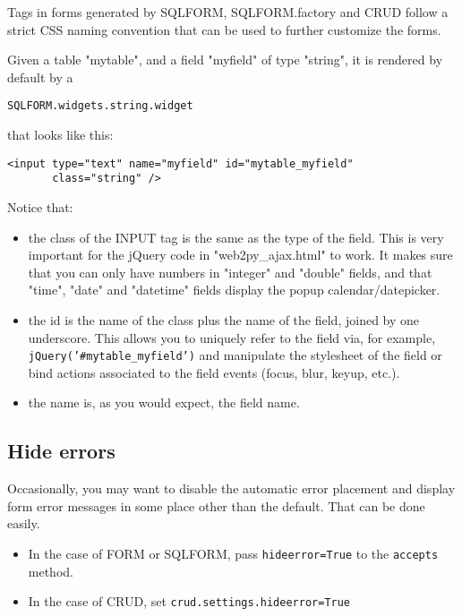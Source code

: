 \documentclass[justified,sixbynine,notoc]{tufte-book}
\def\ft{\small\tt}
\def\inxx#1{\index{#1}}
\begin{document}
\begin{fullwidth}
Tags in forms generated by SQLFORM, SQLFORM.factory and CRUD follow a strict CSS naming convention that can be used to further customize the forms.

Given a table "mytable", and a field "myfield" of type "string", it is rendered by default by a
\begin{lstlisting}
SQLFORM.widgets.string.widget
\end{lstlisting}
\noindent that looks like this:
\begin{lstlisting}[keywords={}]
<input type="text" name="myfield" id="mytable_myfield"
       class="string" />
\end{lstlisting}

Notice that:
\begin{itemize}
\item the class of the INPUT tag is the same as the type of the field. This is very important for the jQuery code in "web2py\_ajax.html" to work. It makes sure that you can only have numbers in "integer" and "double" fields, and that "time", "date" and "datetime" fields display the popup calendar/datepicker.

\item the id is the name of the class plus the name of the field, joined by one underscore. This allows you to uniquely refer to the field via, for example, {\ft jQuery('\#mytable\_myfield')} and manipulate the stylesheet of the field or bind actions associated to the field events (focus, blur, keyup, etc.).

\item the name is, as you would expect, the field name.
\end{itemize}

\goodbreak\subsection{Hide errors}

\inxx{hideerror}

Occasionally, you may want to disable the automatic error placement and display form error messages in some place other than the default. That can be done easily.

\begin{itemize}
\item In the case of FORM or SQLFORM, pass {\ft hideerror=True} to the {\ft accepts} method.

\item In the case of CRUD, set {\ft crud.settings.hideerror=True}
\end{itemize}


\end{fullwidth}
\end{document}
